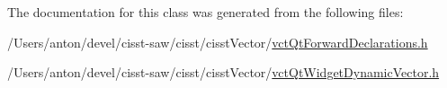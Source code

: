 The documentation for this class was generated from the following files\+:\begin{DoxyCompactItemize}
\item 
/\+Users/anton/devel/cisst-\/saw/cisst/cisst\+Vector/\hyperlink{vct_qt_forward_declarations_8h}{vct\+Qt\+Forward\+Declarations.\+h}\item 
/\+Users/anton/devel/cisst-\/saw/cisst/cisst\+Vector/\hyperlink{vct_qt_widget_dynamic_vector_8h}{vct\+Qt\+Widget\+Dynamic\+Vector.\+h}\end{DoxyCompactItemize}

